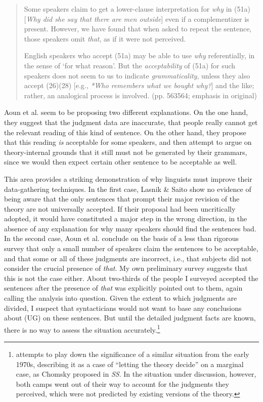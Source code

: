 \begin{quote}
Some speakers claim to get a lower-clause interpretation for \textit{why} in (51a) [\textit{Why did she say that there are men outside}] even if a complementizer is present. However, we have found that when asked to repeat the sentence, those speakers omit \textit{that}, as if it were not perceived.


English speakers who accept (51a) may be able to use \textit{why} referentially, in the sense of `for what reason'. But the \textit{acceptability} of (51a) for such speakers does not seem to us to indicate \textit{grammaticality}, unless they also accept (26)\textendash{}(28) [e.g., \textit{*Who remembers what we bought why?}] and the like; rather, an analogical process is involved. (pp. 563\textendash{}564; emphasis in original)
\end{quote}

\noindent
Aoun et al. seem to be proposing  two different explanations. On the one hand, they suggest that the judgment data are inaccurate, that people really cannot get the relevant reading of this kind of sentence. On the other hand, they propose that this reading \textit{is} acceptable for some speakers, and then attempt to argue on theory-internal grounds that it still must not be generated by their grammars, since we would then expect certain other sentence to be acceptable as well.

This area provides a striking demonstration of why linguists must improve their data-gathering techniques. In the first case, Lasnik \& Saito show no evidence of being aware that the only sentences that prompt their major revision of the theory are not universally accepted. If their proposal had been uncritically adopted, it would have constituted a major step in the wrong direction, in the absence of any explanation for why many speakers should find the sentences bad. In the second case, Aoun et al. conclude on the basis of a less than rigorous survey that only a small number of speakers claim the sentences to be acceptable, and that some or all of these judgments are incorrect, i.e., that subjects did not consider the crucial presence of \textit{that}. My own preliminary survey suggests that this is not the case either. About two-thirds of the people I surveyed accepted the sentences after the presence of \textit{that} was explicitly pointed out to them, again calling the analysis into question. Given the extent to which judgments are divided, I suspect that syntacticians would not want to base any conclusions about  (UG) on these sentences. But until the detailed judgment facts are known, there is no way to assess the situation accurately.\footnote{\citet{Newmeyer1983} attempts to play down the significance of a similar situation from the early 1970s, describing it as a case of ``letting the theory decide'' on a marginal case, as Chomsky proposed in \textit{SS}. In the situation under discussion, however, both camps went out of their way to account for the judgments they perceived, which were not predicted by existing versions of the theory.}


